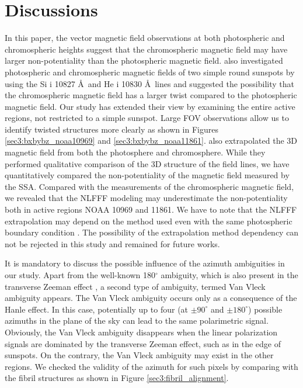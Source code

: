 \documentclass[manuscript]{aastex61}
\begin{document}
\section{Discussions
 \label{sec3:discussion}}
In this paper, the vector magnetic field observations at both photospheric and chromospheric
heights suggest that the 
chromospheric magnetic field may have larger non-potentiality than the photospheric
magnetic field. \cite{2017A&A...604A..98J} also investigated photospheric and
chromospheric magnetic fields of two simple round sunspots by using the Si {\sc i} 10827 \AA \
and He {\sc i} 10830 \AA\ lines and suggested the possibility that the
chromospheric magnetic field has a larger twist compared to the photospheric magnetic
field. Our study has extended their view by examining the entire active
regions, not restricted to a simple sunspot. Large FOV observations allow us to
identify twisted structures more clearly as shown in Figures
\ref{sec3:bxbybz_noaa10969} and \ref{sec3:bxbybz_noaa11861}.
\cite{2012ApJ...748...23Y} also extrapolated the 3D magnetic field from both
the photosphere and chromosphere. While they performed qualitative comparison
of the 3D structure of the field lines, we have quantitatively compared the
non-potentiality of the magnetic field measured by the SSA.
Compared with the measurements of the chromospheric magnetic field, we revealed
that the NLFFF modeling  may underestimate the non-potentiality both in active
regions NOAA 10969 and 11861.
We have to note that the NLFFF extrapolation may depend on the method used even with the same photospheric boundary condition \citep{2009ApJ...696.1780D}.  
 The possibility of the extrapolation method dependency can not be rejected in this study and remained for future works.

It is mandatory to discuss the possible influence of the azimuth ambiguities in
our study. Apart from the well-known 180$^\circ$ ambiguity, which is also
present in the transverse Zeeman effect 
\citep{2004ASSL..307.....L}, a second type of ambiguity, termed Van Vleck ambiguity
\citep{2004ASSL..307.....L, 2008ApJ...683..542A} appears. The Van Vleck ambiguity occurs
only as a consequence of the Hanle effect. In this case, potentially up to four (at $\pm 90^\circ$ and $\pm 180^\circ$)
possible azimuths in the plane of the sky can lead to the same polarimetric signal. 
Obviously, the Van Vleck ambiguity disappears when the linear polarization signals are dominated 
by the transverse Zeeman effect, such as in the edge of sunspots. 
On the contrary, the Van Vleck ambiguity may exist in the other regions.
We checked the validity of the azimuth for such pixels by comparing with the fibril structures as shown in Figure \ref{sec3:fibril_alignment}.
\end{document}
